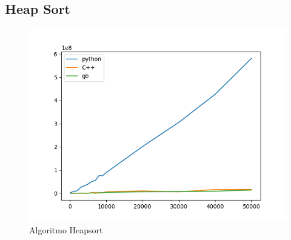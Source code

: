 \documentclass{article}
\begin{document}
\subsection{Heap Sort}
\begin{figure}[H]
	\centering
	\includegraphics[scale=0.6]{img/heapsort_1.png}
	\caption{Algoritmo Heapsort}
	\label{fig:my_label}
\end{figure}
\newpage
\end{document}
